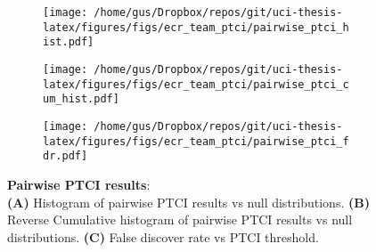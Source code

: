 
\begin{figure}[hp]
% 
\begin{subfigure}[t]{.5\linewidth}
\texttt{[image: /home/gus/Dropbox/repos/git/uci-thesis-latex/figures/figs/ecr\_team\_ptci/pairwise\_ptci\_hist.pdf]}
\caption{}
\label{fig:pairwise-ptci-hists-base}
\end{subfigure}%
\quad
\begin{subfigure}[t]{.5\linewidth}
\texttt{[image: /home/gus/Dropbox/repos/git/uci-thesis-latex/figures/figs/ecr\_team\_ptci/pairwise\_ptci\_cum\_hist.pdf]}
\caption{}
\label{fig:pairwise-ptci-hists-rcum-hist}
\end{subfigure}
% 
\begin{subfigure}[t]{.5\linewidth}
\texttt{[image: /home/gus/Dropbox/repos/git/uci-thesis-latex/figures/figs/ecr\_team\_ptci/pairwise\_ptci\_fdr.pdf]}
\caption{}
\label{fig:pairwise-ptci-hists-fdr}
\end{subfigure}
% 
\caption[Pairwise PTCI results]{\sf \textbf{Pairwise PTCI results}:\\
\textbf{(A)} Histogram of pairwise PTCI results vs null distributions.
\textbf{(B)} Reverse Cumulative histogram of pairwise PTCI results vs null distributions.
\textbf{(C)} False discover rate vs PTCI threshold.}
\label{fig:pairwise-ptci-hists}
\end{figure}